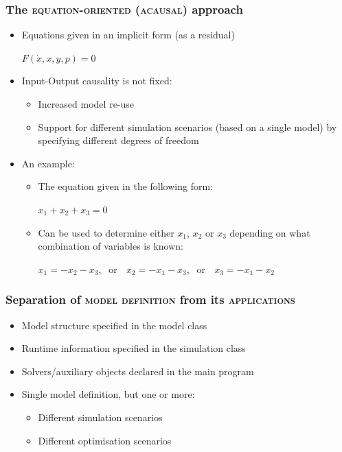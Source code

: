 \documentclass[compress,newPxFont,sthlmFooter]{beamer}
\begin{document}
\begin{frame}
\frametitle{The \textsc{equation-oriented} (\textsc{acausal}) approach}
\begin{itemize}
  \item \alert{Equations given in an implicit form} (as a residual)
    \begin{center}
      $F(\dot {x}, x, y, p) = 0$
    \end{center}
  \item \alert{Input-Output causality} is \alert{not fixed}:
    \begin{itemize}
        \item Increased model re-use
        \item Support for \alert{different simulation scenarios} (based on a single model) by specifying different degrees of freedom
    \end{itemize}
  \item An example:
    \begin{itemize}
        \item The equation given in the following form:
            \begin{center}
                $x_1 + x_2 + x_3 = 0$
            \end{center}
        \item Can be used to determine either $x_1$, $x_2$ or $x_3$ depending on what combination of variables is known:
            \begin{center}
                $x_1 = -x_2 - x_3, \;$ \alert{or}  $\;$
                $x_2 = -x_1 - x_3, \;$ \alert{or}  $\;$
                $x_3 = -x_1 - x_2$
            \end{center}
    \end{itemize}
\end{itemize}
\end{frame}

\begin{frame}
\frametitle{Separation of \textsc{model definition} from its \textsc{applications}}
\begin{itemize}
  \item \alert{Model structure} specified in the \alert{model class}
  \item \alert{Runtime information} specified in the \alert{simulation class}
  \item \alert{Solvers/auxiliary objects} declared in the \alert{main program}
  \item \alert{Single model definition}, but \alert{one or more}:
  \begin{itemize}
    \item Different \alert{simulation scenarios}
    \item Different \alert{optimisation scenarios}
  \end{itemize}
\end{itemize}
\end{frame}
\end{document}
